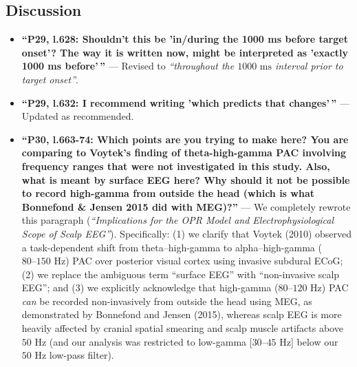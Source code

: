 \documentclass[11pt]{article}
\begin{document}
\subsection*{Discussion}
\begin{itemize}[leftmargin=1.5em]
    \item \textbf{``P29, l.628: Shouldn't this be 'in/during the 1000 ms before target onset'? The way it is written now, might be interpreted as 'exactly 1000 ms before'\,''} --- \textcolor{revblue}{Revised to \textit{``throughout the $1000\text{ ms}$ interval prior to target onset''}.}
    \item \textbf{``P29, l.632: I recommend writing 'which predicts that changes'\,''} --- \textcolor{revblue}{Updated as recommended.}
    \item \textbf{``P30, l.663-74: Which points are you trying to make here? You are comparing to Voytek's finding of theta-high-gamma PAC involving frequency ranges that were not investigated in this study. Also, what is meant by surface EEG here? Why should it not be possible to record high-gamma from outside the head (which is what Bonnefond \& Jensen 2015 did with MEG)?''} --- \textcolor{revblue}{We completely rewrote this paragraph (\textit{``Implications for the OPR Model and Electrophysiological Scope of Scalp EEG''}). Specifically: (1) we clarify that Voytek (2010) observed a task-dependent shift from theta--high-gamma to alpha--high-gamma ($80\text{--}150\text{ Hz}$) PAC over posterior visual cortex using invasive subdural ECoG; (2) we replace the ambiguous term ``surface EEG'' with ``non-invasive scalp EEG''; and (3) we explicitly acknowledge that high-gamma ($80\text{--}120\text{ Hz}$) PAC \textit{can} be recorded non-invasively from outside the head using MEG, as demonstrated by Bonnefond and Jensen (2015), whereas scalp EEG is more heavily affected by cranial spatial smearing and scalp muscle artifacts above $50\text{ Hz}$ (and our analysis was restricted to low-gamma [$30\text{--}45\text{ Hz}$] below our $50\text{ Hz}$ low-pass filter).}
\end{itemize}
\end{document}
